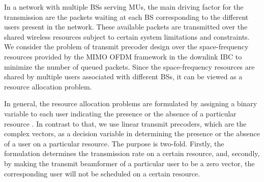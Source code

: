 
In a network with multiple \acp{BS} serving \acp{MU}, the main driving factor for the transmission are the packets waiting at each \ac{BS} corresponding to the different users present in the network. These available packets are transmitted over the shared wireless resources subject to certain system limitations and constraints. We consider the problem of transmit precoder design over the space-frequency resources provided by the \ac{MIMO} \ac{OFDM} framework in the downlink \ac{IBC} to minimize the number of queued packets. Since the space-frequency resources are shared by multiple users associated with different \acp{BS}, it can be viewed as a resource allocation problem.

In general, the resource allocation problems are formulated by assigning a binary variable to each user indicating the presence or the absence of a particular resource \cite{admission_control}. In contrast to that, we use linear transmit precoders, which are the complex vectors, as a decision variable in determining the presence or the absence of a user on a particular resource. The purpose is two-fold. Firstly, the formulation determines the transmission rate on a certain resource, and, secondly, by making the transmit beamformer of a particular user to be a zero vector, the corresponding user will not be scheduled on a certain resource.


